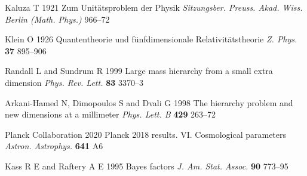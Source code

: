\documentclass[12pt]{article}
\begin{document}
\begin{thebibliography}{20}

Kaluza T 1921 Zum Unitätsproblem der Physik {\it Sitzungsber. Preuss. Akad. Wiss. Berlin (Math. Phys.)} 966--72

Klein O 1926 Quantentheorie und fünfdimensionale Relativitätstheorie {\it Z. Phys.} {\bf 37} 895--906

Randall L and Sundrum R 1999 Large mass hierarchy from a small extra dimension {\it Phys. Rev. Lett.} {\bf 83} 3370--3

Arkani-Hamed N, Dimopoulos S and Dvali G 1998 The hierarchy problem and new dimensions at a millimeter {\it Phys. Lett. B} {\bf 429} 263--72

Planck Collaboration 2020 Planck 2018 results. VI. Cosmological parameters {\it Astron. Astrophys.} {\bf 641} A6

Kass R E and Raftery A E 1995 Bayes factors {\it J. Am. Stat. Assoc.} {\bf 90} 773--95

\end{thebibliography}
\end{document}
